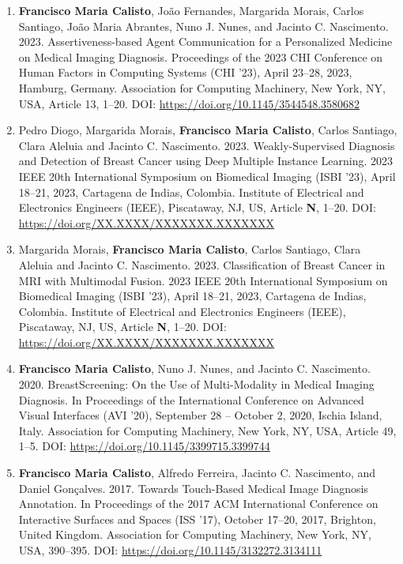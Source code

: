 \begin{enumerate}
\item {\bf Francisco Maria Calisto}, Jo\~{a}o Fernandes, Margarida Morais, Carlos Santiago, Jo\~{a}o Maria Abrantes, Nuno J. Nunes, and Jacinto C. Nascimento. 2023. Assertiveness-based Agent Communication for a Personalized Medicine on Medical Imaging Diagnosis. Proceedings of the 2023 CHI Conference on Human Factors in Computing Systems (CHI '23), April 23--28, 2023, Hamburg, Germany. Association for Computing Machinery, New York, NY, USA, Article 13, 1–20. DOI: \href{https://doi.org/10.1145/3544548.3580682}{https://doi.org/10.1145/3544548.3580682}
\item Pedro Diogo, Margarida Morais, {\bf Francisco Maria Calisto}, Carlos Santiago, Clara Aleluia and Jacinto C. Nascimento. 2023. Weakly-Supervised Diagnosis and Detection of Breast Cancer using Deep Multiple Instance Learning. 2023 IEEE 20th International Symposium on Biomedical Imaging (ISBI '23), April 18--21, 2023, Cartagena de Indias, Colombia. Institute of Electrical and Electronics Engineers (IEEE), Piscataway, NJ, US, Article {\bf N}, 1–20. DOI: \href{https://doi.org/XX.XXXX/XXXXXXX.XXXXXXX}{https://doi.org/XX.XXXX/XXXXXXX.XXXXXXX}
\item Margarida Morais, {\bf Francisco Maria Calisto}, Carlos Santiago, Clara Aleluia and Jacinto C. Nascimento. 2023. Classification of Breast Cancer in MRI with Multimodal Fusion. 2023 IEEE 20th International Symposium on Biomedical Imaging (ISBI '23), April 18--21, 2023, Cartagena de Indias, Colombia. Institute of Electrical and Electronics Engineers (IEEE), Piscataway, NJ, US, Article {\bf N}, 1–20. DOI: \href{https://doi.org/XX.XXXX/XXXXXXX.XXXXXXX}{https://doi.org/XX.XXXX/XXXXXXX.XXXXXXX}
\item {\bf Francisco Maria Calisto}, Nuno J. Nunes, and Jacinto C. Nascimento. 2020. BreastScreening: On the Use of Multi-Modality in Medical Imaging Diagnosis. In Proceedings of the International Conference on Advanced Visual Interfaces (AVI '20), September 28 -- October 2, 2020, Ischia Island, Italy. Association for Computing Machinery, New York, NY, USA, Article 49, 1–5. DOI: \href{https://doi.org/10.1145/3399715.3399744}{https://doi.org/10.1145/3399715.3399744}
\item {\bf Francisco Maria Calisto}, Alfredo Ferreira, Jacinto C. Nascimento, and Daniel Gonçalves. 2017. Towards Touch-Based Medical Image Diagnosis Annotation. In Proceedings of the 2017 ACM International Conference on Interactive Surfaces and Spaces (ISS '17), October 17--20, 2017, Brighton, United Kingdom. Association for Computing Machinery, New York, NY, USA, 390–395. DOI: \href{https://doi.org/10.1145/3132272.3134111}{https://doi.org/10.1145/3132272.3134111}
\end{enumerate}

